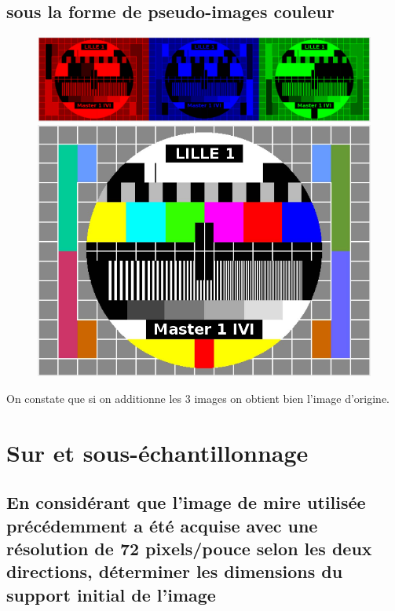 \documentclass[a4paper,12pt]{report}
\begin{document}
\subsection*{sous la forme de pseudo-images couleur}

\begin{figure}[!ht]
	\center
	\includegraphics[scale=0.4]{image/p12.png}
	\includegraphics[scale=0.4]{image/p13.png}
\end{figure}

\noindent On constate que si on additionne les 3 images on obtient bien l'image d'origine.

\newpage

\section*{Sur et sous-échantillonnage}

\subsection*{En considérant que l'image de mire utilisée précédemment a été acquise avec une résolution de 72 pixels/pouce selon les deux directions, déterminer les dimensions du support initial de l'image}
\end{document}
